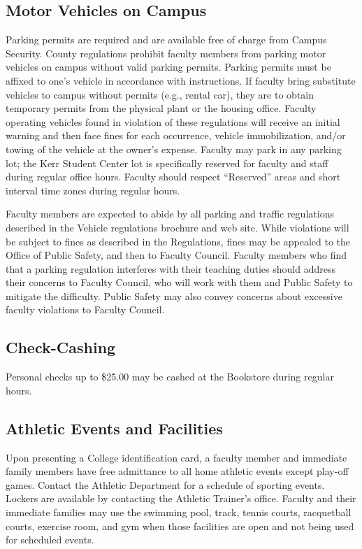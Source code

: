 	\subsection{Motor Vehicles on Campus}

		Parking permits are required and are available free of charge from Campus Security.  County regulations prohibit faculty members from parking motor vehicles on campus without valid parking permits.  Parking permits must be affixed to one's vehicle in accordance with instructions.  If faculty bring substitute vehicles to campus without permits (e.g., rental car), they are to obtain temporary permits from the physical plant or the housing office.  Faculty operating vehicles found in violation of these regulations will receive an initial warning and then face fines for each occurrence, vehicle immobilization, and/or towing of the vehicle at the owner's expense.  Faculty may park in any parking lot; the Kerr Student Center lot is specifically reserved for faculty and staff during regular office hours.  Faculty should respect ``Reserved'' areas and short interval time zones during regular hours.

		Faculty members are expected to abide by all parking and traffic regulations described in the Vehicle regulations brochure and web site.  While violations will be subject to fines as described in the Regulations, fines may be appealed to the Office of Public Safety, and then to Faculty Council.  Faculty members who find that a parking regulation interferes with their teaching duties should address their concerns to Faculty Council, who will work with them and Public Safety to mitigate the difficulty.  Public Safety may also convey concerns about excessive faculty violations to Faculty Council.
	\subsection{Check-Cashing}
		Personal checks up to \$25.00 may be cashed at the Bookstore during regular hours.
	\subsection{ Athletic Events and Facilities}
		Upon presenting a College identification card, a faculty member and immediate family members have free admittance to all home athletic events except play-off games.  Contact the Athletic Department for a schedule of sporting events.  Lockers are available by contacting the Athletic Trainer's office.  Faculty and their immediate families may use the swimming pool, track, tennis courts, racquetball courts, exercise room, and gym when those facilities are open and not being used for scheduled events.
